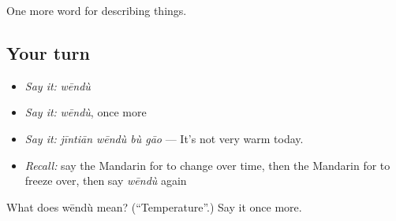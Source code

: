 \begin{grammarlens}[title={What you've built}]
One more word for describing things.
\end{grammarlens}

\subsection*{Your turn}
\begin{itemize}
\raggedright
  \item \emph{Say it:} \emph{wēndù}
  \item \emph{Say it:} \emph{wēndù}, once more
  \item \emph{Say it:} \emph{jīntiān wēndù bù gāo} — It's not very warm today.
  \item \emph{Recall:} say the Mandarin for to change over time, then the Mandarin for to freeze over, then say \emph{wēndù} again
\end{itemize}

\begin{tcolorbox}[breakable,colback=teal!4,colframe=teal!35!black,title={Before you move on}]
What does wēndù mean? (\textquotedblleft{}Temperature\textquotedblright{}.) Say it once more.
\end{tcolorbox}
